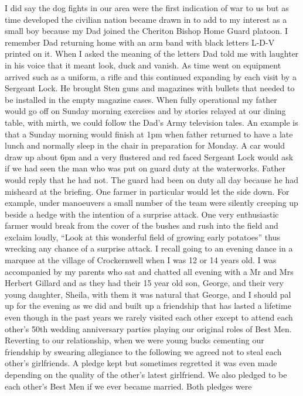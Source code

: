 I did say the dog fights in our area were the first indication of war to us but
as time developed the civilian nation became drawn in to add to my interest as
a small boy because my Dad joined the Cheriton Bishop Home Guard platoon. I
remember Dad returning home with an arm band with black letters L-D-V printed
on it. When I asked the meaning of the letters Dad told me with laughter in his
voice that it meant look, duck and vanish. As time went on equipment arrived
such as a uniform, a rifle and this continued expanding by each visit by a
Sergeant Lock. He brought Sten guns and magazines with bullets that needed to
be installed in the empty magazine cases. When fully operational my father
would go off on Sunday morning exercises and by stories relayed at our dining
table, with mirth, we could follow the Dad's Army television tales. An example
is that a Sunday morning would finish at 1pm when father returned to have a
late lunch and normally sleep in the chair in preparation for Monday. A car
would draw up about 6pm and a very flustered and red faced Sergeant Lock would
ask if we had seen the man who was put on guard duty at the waterworks. Father
would reply that he had not. The guard had been on duty all day because he had
misheard at the briefing. One farmer in particular would let the side down. For
example, under manoeuvers a small number of the team were silently creeping up
beside a hedge with the intention of a surprise attack. One very enthusiastic
farmer would break from the cover of the bushes and rush into the field and
exclaim loudly, ``Look at this wonderful field of growing early potatoes'' thus
wrecking any chance of a surprise attack. I recall going to an evening dance in
a marquee at the village of Crockernwell when I was 12 or 14 years old. I was
accompanied by my parents who sat and chatted all evening with a Mr and Mrs
Herbert Gillard and as they had their 15 year old son, George, and their very
young daughter, Sheila, with them it was natural that George, and I should pal
up for the evening as we did and built up a friendship that has lasted a
lifetime even though in the past years we rarely visited each other except to
attend each other's 50th wedding anniversary parties playing our original roles
of Best Men. Reverting to our relationship, when we were young bucks cementing
our friendship by swearing allegiance to the following we agreed not to steal
each other's girlfriends. A pledge kept but sometimes regretted it was even
made depending on the quality of the other's latest girlfriend. We also pledged
to be each other's Best Men if we ever became married. Both pledges were
